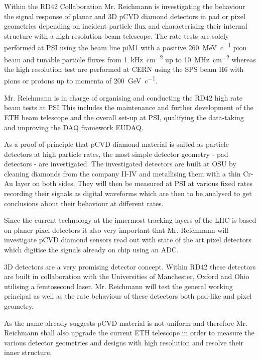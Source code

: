 
Within the RD42 Collaboration Mr. Reichmann is investigating the behaviour the signal response of planar and 3D \ac{pCVD} diamond detectors in pad or pixel geometries depending on incident particle flux and characterising their internal structure with a high resolution beam telescope. The rate tests are solely performed at \ac{PSI} using the beam line piM1 with a positive \SI{260}{\mega\electronvolt\per c} pion beam and tunable particle fluxes from \SI{1}{\kilo\hertz\per\centi\meter^2} up to \SI{10}{\mega\hertz\per\centi\meter^2} whereas the high resolution test are performed at CERN using the SPS beam H6 with pions or protons up to momenta of \SI{200}{\giga\electronvolt\per c}.\parsmall

Mr. Reichmann is in charge of organising and conducting the RD42 high rate beam tests at \ac{PSI} %
This includes the maintenance and further development of the ETH beam telescope and the overall set-up at \ac{PSI}, qualifying the data-taking and improving the \ac{DAQ} framework EUDAQ.\parsmall

As a proof of principle that \ac{pCVD} diamond material is suited as particle detectors at high particle rates, the most simple detector geometry - pad detectors - are investigated. The investigated detectors are built at \ac{OSU} by cleaning diamonds from the company II-IV and metallising them with a thin Cr-Au layer on both sides. They will then be measured at \ac{PSI} at various fixed rates recording their signals as digital waveforms which are then to be analysed to get conclusions about their behaviour at different rates.\parsmall

Since the current technology at the innermost tracking layers of the LHC is based on planer pixel detectors it also very important that Mr. Reichmann will investigate \ac{pCVD} diamond sensors read out with state of the art pixel detectors which digitise the signals already on chip using an \ac{ADC}. \parsmall

3D detectors are a very promising detector concept. Within RD42 these detectors are built in collaboration with the Universities of Manchester, Oxford and Ohio utilising a femtosecond laser. Mr. Reichmann will test the general working principal as well as the rate behaviour of these detectors both pad-like and pixel geometry.\parsmall

As the name already suggests \ac{pCVD} material is not uniform and therefore Mr. Reichmann shall also upgrade the current ETH telescope in order to measure the various detector geometries and designs with high resolution and resolve their inner structure.\parend